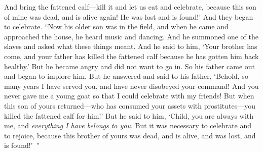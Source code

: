 \begin{biblechapter}
\verse And bring the fattened calf—kill it and let us eat and celebrate,
\verse because this son of mine was dead, and is alive again! He was lost and is found!’ And they began to celebrate.
\verse “Now his older son was in the field, and when he came and approached the house, he heard music and dancing.
\verse And he summoned one of the slaves and asked what these things meant.
\verse And he said to him, ‘Your brother has come, and your father has killed the fattened calf because he has gotten him back healthy.’
\verse But he became angry and did not want to go in. So his father came out and began to implore him.
\verse But he answered and said to his father, ‘Behold, so many years I have served you, and have never disobeyed your command! And you never gave me a young goat so that I could celebrate with my friends!
\verse But when this son of yours returned—who has consumed your assets with prostitutes—you killed the fattened calf for him!’
\verse But he said to him, ‘Child, you are always with me, and \textit{everything I have belongs to you}.
\verse But it was necessary to celebrate and to rejoice, because this brother of yours was dead, and is alive, and was lost, and is found!’ ”
\end{biblechapter}

